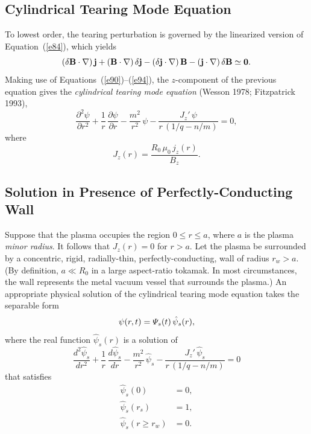 \documentclass[notitlepage,12pt]{article}
\begin{document}
\subsection{Cylindrical Tearing Mode Equation}
To lowest order, the tearing perturbation is governed by the linearized version of Equation~(\ref{e84}), which yields
\begin{equation}\label{e96}
(\delta{\bf B}\cdot \nabla)\,{\bf j} + ({\bf B}\cdot\nabla)\,\delta{\bf j} - (\delta{\bf j}\cdot\nabla)\,{\bf B} - 
({\bf j}\cdot\nabla)\,\delta {\bf B}\simeq {\bf 0}.
\end{equation}
Making use of Equations~(\ref{e90})--(\ref{e94}), the $z$-component of the previous equation gives
the {\em cylindrical tearing mode equation}\/ (Wesson 1978; Fitzpatrick 1993),
\begin{equation}
\frac{\partial^2\psi}{\partial r^2} + \frac{1}{r}\,\frac{\partial\psi}{\partial r}-\frac{m^2}{r^2}\,\psi - \frac{J_z'\,\psi}{r\,(1/q-n/m)}=  0,
\end{equation}
where 
\begin{equation}
J_z(r)= \frac{R_0\,\mu_0\,j_z(r)}{B_z}.
\end{equation}

\subsection{Solution in Presence of Perfectly-Conducting Wall}\label{perfect}
Suppose that the plasma occupies the region $0\leq r\leq a$, where $a$ is the plasma {\em minor radius}. It follows that
$J_z(r)=0$ for $r>a$. Let the plasma be surrounded by a concentric, rigid, radially-thin, perfectly-conducting, wall of radius $r_w>a$. 
(By definition, $a\ll R_0$ in a large aspect-ratio tokamak. In most circumstances, the wall represents the metal vacuum vessel that surrounds  the plasma.) An appropriate
physical solution of the cylindrical tearing mode equation takes the separable form
\begin{equation}\label{e99}
\psi(r,t)= {\mit\Psi}_s(t)\,\hat{\psi}_s(r),
\end{equation}
where the real function $\hat{\psi}_s(r)$ is a solution of 
\begin{equation}\label{e100}
\frac{d^2\hat{\psi}_s}{dr^2} + \frac{1}{r}\,\frac{d\hat{\psi}_s}{dr}-\frac{m^2}{r^2}\,\hat{\psi}_s - \frac{J_z'\,\hat{\psi}_s}{r\,(1/q-n/m)}= 0
\end{equation}
that satisfies
\begin{align}\label{e101}
\hat{\psi}_s(0) &= 0,\\[0.5ex]
\hat{\psi}_s(r_s) &= 1,\label{e102}\\[0.5ex]
\hat{\psi}_s(r\geq r_w) &= 0.\label{e103}
\end{align}
\end{document}

